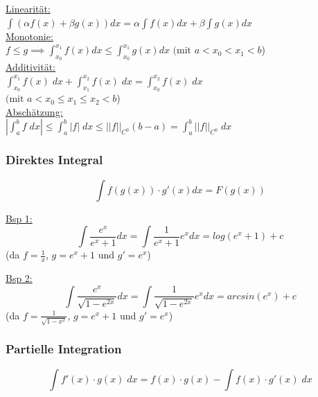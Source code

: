 \documentclass[6pt]{article}
\begin{document}
\begin{multicols*}{3}
			 \underline{Linearit{\"a}t:} \vspace{1mm} \\
			$\int \left( \alpha f(x) + \beta g(x) \right)  dx = \alpha  \int f(x) dx +  \beta \int g(x)  dx$ \vspace{2mm} \\		
			 \underline{Monotonie:} \vspace{1mm} \\
				$f \leq g  \implies  \int_{x_0}^{x_1} f(x)  dx
				\leq \int_{x_0}^{x_1} g(x)  dx  \text{ (mit } a < x_0 < x_1 < b$) \vspace{2mm} \\
			 \underline{Additivit{\"a}t:} \vspace{1mm} \\
			$\int_{x_0}^{x_1} f(x) \; dx + \int_{x_1}^{x_2} f(x) \; dx
				= \int_{x_0}^{x_2} f(x) \; dx \quad $\vspace{1mm} \\
				$\text{(mit } a < x_0 \leq x_1 \leq x_2 < b$) \vspace{2mm} \\
			 \underline{Absch{\"a}tzung:} \vspace{1mm} \\
			$\left| \int_a^b f \; dx \right| \leq
				\int_a^b |f| \; dx \leq ||f||_{C^0} (b-a) = \int_a^b ||f||_{C^0} \; dx$

	\subsubsection*{Direktes Integral}
	\[
			\int f(g(x)) \cdot g'(x) dx = F(g(x))
	\]
	
	\vspace{2mm} 
	\underline{Bsp 1:} \\
	\[ 
			\int \frac{e^x}{e^x+1}dx = \int \frac{1}{e^x+1} e^x dx = log(e^x+1) + c
	\]
		(da $f=\frac{1}{x}$, $g= e^x + 1$ und $g'=e^x$)
		
	\vspace{3mm} 
	\underline{Bsp 2:} \\
	\[ 
			\int \frac{e^x}{\sqrt{1-e^{2x}}}dx = \int \frac{1}{\sqrt{1-e^{2x}}} e^x dx = arcsin(e^x) + c
	\]
		(da $f=\frac{1}{\sqrt{1-x^2}}$, $g=e^x + 1$ und $g'=e^x$)

	\columnbreak	
	\subsubsection*{Partielle Integration}
		\[ \int f'(x) \cdot g(x) \; dx = f(x) \cdot g(x) - \int f(x)\cdot g'(x) \; dx \]
		

\end{multicols*}
\end{document}
